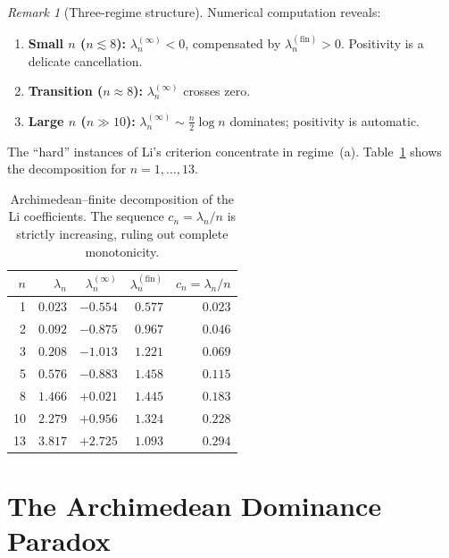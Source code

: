 \documentclass[12pt,a4paper]{article}
\theoremstyle{definition}
\theoremstyle{remark}
\newtheorem{remark}[theorem]{Remark}
\begin{document}
\begin{remark}[Three-regime structure]
\label{rem:three-regime}
Numerical computation reveals:
\begin{enumerate}[label=(\alph*)]
  \item \textbf{Small $n$ ($n \lesssim 8$):} $\lambda_n^{(\infty)} < 0$, compensated by $\lambda_n^{(\mathrm{fin})} > 0$. Positivity is a delicate cancellation.
  \item \textbf{Transition ($n \approx 8$):} $\lambda_n^{(\infty)}$ crosses zero.
  \item \textbf{Large $n$ ($n \gg 10$):} $\lambda_n^{(\infty)} \sim \frac{n}{2}\log n$ dominates; positivity is automatic.
\end{enumerate}
The ``hard'' instances of Li's criterion concentrate in regime~(a). Table~\ref{tab:li-coefficients} shows the decomposition for $n = 1, \ldots, 13$.
\end{remark}

\begin{table}[h]
\centering
\renewcommand{\arraystretch}{1.15}
\begin{tabular}{r|r|r|r|r}
$n$ & $\lambda_n$ & $\lambda_n^{(\infty)}$ & $\lambda_n^{(\mathrm{fin})}$ & $c_n = \lambda_n/n$ \\\hline
1 & $0.023$ & $-0.554$ & $0.577$ & $0.023$ \\
2 & $0.092$ & $-0.875$ & $0.967$ & $0.046$ \\
3 & $0.208$ & $-1.013$ & $1.221$ & $0.069$ \\
5 & $0.576$ & $-0.883$ & $1.458$ & $0.115$ \\
8 & $1.466$ & $+0.021$ & $1.445$ & $0.183$ \\
10 & $2.279$ & $+0.956$ & $1.324$ & $0.228$ \\
13 & $3.817$ & $+2.725$ & $1.093$ & $0.294$ \\
\end{tabular}
\caption{Archimedean--finite decomposition of the Li coefficients. The sequence $c_n = \lambda_n/n$ is strictly increasing, ruling out complete monotonicity.}
\label{tab:li-coefficients}
\end{table}


\section{The Archimedean Dominance Paradox}
\label{sec:dominance}
\end{document}
